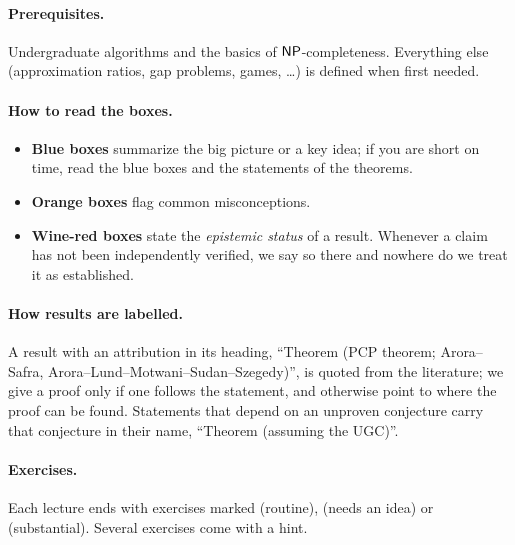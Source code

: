 \documentclass[11pt,a4paper,oneside]{book}
\begin{document}
\paragraph{Prerequisites.}
Undergraduate algorithms and the basics of $\mathsf{NP}$-completeness.  Everything else
(approximation ratios, gap problems, games, \dots) is defined when first needed.

\paragraph{How to read the boxes.}
\begin{itemize}
  \item \textbf{Blue boxes} summarize the big picture or a key idea; if you are
        short on time, read the blue boxes and the statements of the theorems.
  \item \textbf{Orange boxes} flag common misconceptions.
  \item \textbf{Wine-red boxes} state the \emph{epistemic status} of a result.  Whenever
        a claim has not been independently verified, we say so there and nowhere do we
        treat it as established.
\end{itemize}

\paragraph{How results are labelled.}
A result with an attribution in its heading, \eg ``Theorem (PCP theorem;
Arora--Safra, Arora--Lund--Motwani--Sudan--Szegedy)'', is quoted from the literature; we
give a proof only if one follows the statement, and otherwise point to where the proof
can be found.  Statements that
depend on an unproven conjecture carry that conjecture in their name, \eg
``Theorem (assuming the UGC)''.

\paragraph{Exercises.}
Each lecture ends with exercises marked \stars{$\star$} (routine),
\stars{$\star\star$} (needs an idea) or \stars{$\star\star\star$} (substantial).
Several exercises come with a hint.

\tableofcontents

\mainmatter










\end{document}
